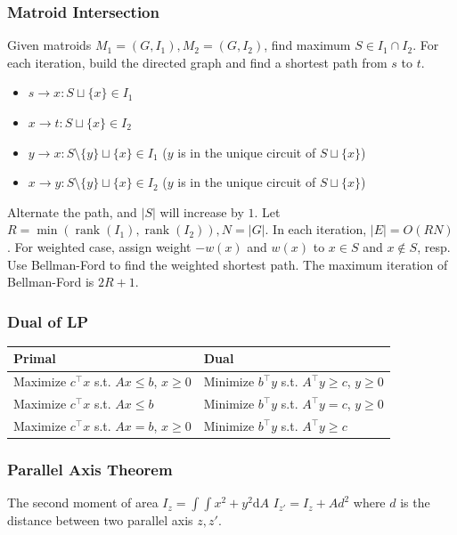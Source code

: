 \subsubsection{Matroid Intersection}
Given matroids \(M_1=(G,I_1),M_2=(G,I_2)\), find maximum \(S\in I_1\cap I_2\).
For each iteration, build the directed graph and find a shortest path from \(s\) to \(t\).
\begin{itemize}[nosep]
    \item \(s \to x: S \sqcup \{x\} \in I_1\)
    \item \(x \to t: S \sqcup \{x\} \in I_2\)
    \item \(y \to x: S \setminus \{y\} \sqcup \{x\} \in I_1\) (\(y\) is in the unique circuit of \(S \sqcup \{x\}\))
    \item \(x \to y: S \setminus \{y\} \sqcup \{x\} \in I_2\) (\(y\) is in the unique circuit of \(S \sqcup \{x\}\))
\end{itemize}
Alternate the path, and \(|S|\) will increase by \(1\).
Let \(R = \min(\operatorname{rank}(I_1), \operatorname{rank}(I_2)), N = |G|\).
In each iteration, \(|E| = O(RN)\).
For weighted case, assign weight \(-w(x)\) and \(w(x)\) to \(x\in S\) and \(x\notin S\), resp.
Use Bellman-Ford to find the weighted shortest path.
The maximum iteration of Bellman-Ford is \(2R+1\).

\subsubsection{Dual of LP}

\begin{tabular}{|l|l|}
\hline
\textbf{Primal} & \textbf{Dual} \\
\hline
Maximize $c^\intercal x$ s.t. $Ax \leq b$, $x \geq 0$ & Minimize $b^\intercal y$ s.t. $A^\intercal y \geq c$, $y \geq 0$ \\
\hline
Maximize $c^\intercal x$ s.t. $Ax \leq b$ & Minimize $b^\intercal y$ s.t. $A^\intercal y = c$, $y \geq 0$ \\
\hline
Maximize $c^\intercal x$ s.t. $Ax = b$, $x \geq 0$ & Minimize $b^\intercal y$ s.t. $A^\intercal y \geq c$ \\
\hline
\end{tabular}

\subsubsection{Parallel Axis Theorem}
The second moment of area $I_z = \int\int x^2+y^2 \mathrm{d}A$
$I_{z'} = I_z + Ad^2$ where $d$ is the distance between two parallel axis $z, z'$.
